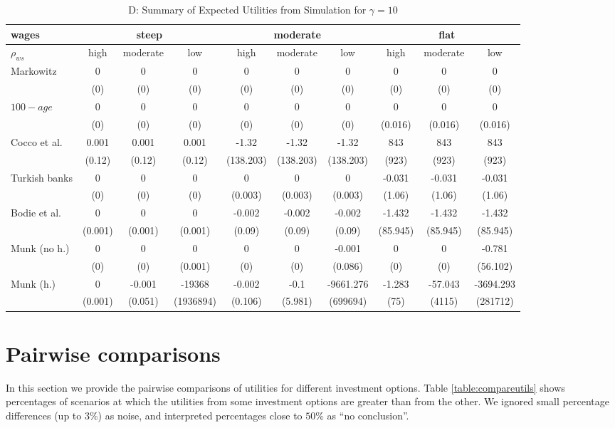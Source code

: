 \begin{table}[h!]\ContinuedFloat
	\centering
	\caption{D: Summary of Expected Utilities from Simulation for $\gamma=10$}
	\label{table:util}
	\begin{tabular}[c]{|l|ccc|ccc|ccc|}
		\hline
		 wages& \multicolumn{3}{c|}{steep} & \multicolumn{3}{c|}{moderate} & \multicolumn{3}{c|}{flat}\\
		\hline
		$\rho_{ws}$&high&moderate&low&high&moderate&low&high&moderate&low\\
		\hline
Markowitz					&0&0&0&0&0&0&0&0&0\\
							&(0)&(0)&(0)&(0)&(0)&(0)&(0)&(0)&(0)\\
$100-age$					&0&0&0&0&0&0&0&0&0\\
							&(0)&(0)&(0)&(0)&(0)&(0)&(0.016)&(0.016)&(0.016)\\
Cocco et al.				&0.001&0.001&0.001&-1.32&-1.32&-1.32&843&843&843\\
							&(0.12)&(0.12)&(0.12)&(138.203)&(138.203)&(138.203)&(923)&(923)&(923)\\
Turkish banks			 	&0&0&0&0&0&0&-0.031&-0.031&-0.031\\
							&(0)&(0)&(0)&(0.003)&(0.003)&(0.003)&(1.06)&(1.06)&(1.06)\\
Bodie et al.			 	&0&0&0&-0.002&-0.002&-0.002&-1.432&-1.432&-1.432\\
							&(0.001)&(0.001)&(0.001)&(0.09)&(0.09)&(0.09)&(85.945)&(85.945)&(85.945)\\
Munk (no h.)				&0&0&0&0&0&-0.001&0&0&-0.781\\
							&(0)&(0)&(0.001)&(0)&(0)&(0.086)&(0)&(0)&(56.102)\\
Munk (h.)					&0&-0.001&-19368&-0.002&-0.1&-9661.276&-1.283&-57.043&-3694.293\\
							&(0.001)&(0.051)&(1936894)&(0.106)&(5.981)&(699694)&(75)&(4115)&(281712)\\
	\hline
	\end{tabular}
\end{table}
\restoregeometry

\section{Pairwise comparisons}
In this section we provide the pairwise comparisons of utilities for different investment options. Table \ref{table:compareutils} shows percentages of scenarios at which the utilities from some investment options are greater than from the other. We ignored small percentage differences (up to $3\%$) as noise, and interpreted percentages close to $50\%$ as ``no conclusion''.

